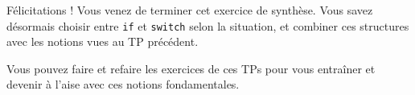 \begin{UPSTIinfor}{Félicitations !}
	Vous venez de terminer cet exercice de synthèse. Vous savez désormais choisir entre \texttt{if} et \texttt{switch} selon la situation, et combiner ces structures avec les notions vues au TP précédent.

	Vous pouvez faire et refaire les exercices de ces TPs pour vous entraîner et devenir à l'aise avec ces notions fondamentales. 
\end{UPSTIinfor}
